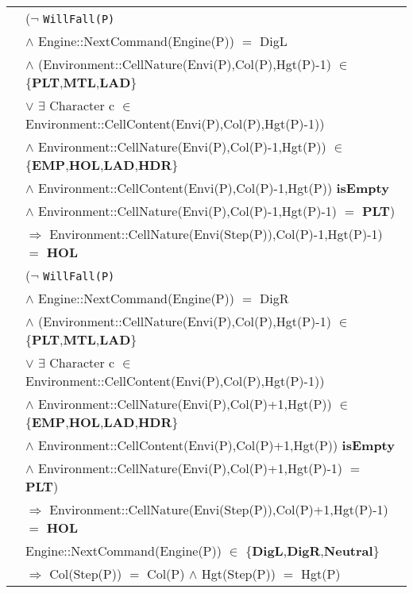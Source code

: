 \documentclass[8pt]{article}
\begin{document}
{\begin{longtable}{rl}
  & ($\neg$ \texttt{WillFall(P)} \\
  & \quad\quad $\land$ \textrm{Engine::NextCommand(Engine(P))} $=$ DigL \\
  & \quad\quad $\land$ (\textrm{Environment::CellNature(Envi(P),Col(P),Hgt(P)-1)} $\in$ \{\textbf{PLT},\textbf{MTL},\textbf{LAD}\} \\
  & \quad\quad\quad\quad $\lor$ $\exists$ Character c $\in$ \textrm{Environment::CellContent(Envi(P),Col(P),Hgt(P)-1)}) \\
  & \quad\quad $\land$ \textrm{Environment::CellNature(Envi(P),Col(P)-1,Hgt(P))} $\in$ \{\textbf{EMP},\textbf{HOL},\textbf{LAD},\textbf{HDR}\} \\
  & \quad\quad $\land$ \textrm{Environment::CellContent(Envi(P),Col(P)-1,Hgt(P))} \textbf{isEmpty} \\
  & \quad\quad $\land$ \textrm{Environment::CellNature(Envi(P),Col(P)-1,Hgt(P)-1)} $=$ \textbf{PLT}) \\
  & \quad\quad $\Rightarrow$ \textrm{Environment::CellNature(Envi(Step(P)),Col(P)-1,Hgt(P)-1)} $=$ \textbf{HOL} \\

  & ($\neg$ \texttt{WillFall(P)} \\
  & \quad\quad $\land$ \textrm{Engine::NextCommand(Engine(P))} $=$ DigR \\
  & \quad\quad $\land$ (\textrm{Environment::CellNature(Envi(P),Col(P),Hgt(P)-1)} $\in$ \{\textbf{PLT},\textbf{MTL},\textbf{LAD}\} \\
  & \quad\quad\quad\quad $\lor$ $\exists$ Character c $\in$ \textrm{Environment::CellContent(Envi(P),Col(P),Hgt(P)-1)}) \\
  & \quad\quad $\land$ \textrm{Environment::CellNature(Envi(P),Col(P)+1,Hgt(P))} $\in$ \{\textbf{EMP},\textbf{HOL},\textbf{LAD},\textbf{HDR}\} \\
  & \quad\quad $\land$ \textrm{Environment::CellContent(Envi(P),Col(P)+1,Hgt(P))} \textbf{isEmpty} \\
  & \quad\quad $\land$ \textrm{Environment::CellNature(Envi(P),Col(P)+1,Hgt(P)-1)} $=$ \textbf{PLT}) \\
  & \quad\quad $\Rightarrow$ \textrm{Environment::CellNature(Envi(Step(P)),Col(P)+1,Hgt(P)-1)} $=$ \textbf{HOL} \\

  & \textrm{Engine::NextCommand(Engine(P))} $\in$ \{\textbf{DigL},\textbf{DigR},\textbf{Neutral}\} \\
  & \quad\quad $\Rightarrow$ \textrm{Col(Step(P))} $=$ \textrm{Col(P)} $\land$ \textrm{Hgt(Step(P))} $=$ \textrm{Hgt(P)} \\

\end{longtable}}
\end{document}
